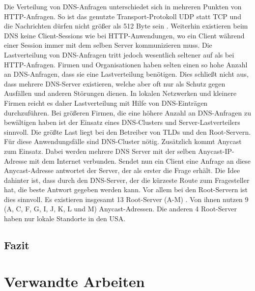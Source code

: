 \documentclass[a4paper, 12pt, BCOR10mm, DIV12, toc=bibliography, toc=listof, german]{scrbook}
\begin{document}
			Die Verteilung von DNS-Anfragen unterschiedet sich in mehreren Punkten von HTTP-Anfragen. So
			ist das genutzte Transport-Protokoll UDP statt TCP und die Nachrichten dürfen nicht größer als
			512 Byte sein \cite{rfc1035}. Weiterhin existieren beim DNS keine Client-Sessions wie bei
			HTTP-Anwendungen, wo ein Client während einer Session immer mit dem selben Server
			kommunizieren muss. Die Lastverteilung von DNS-Anfragen tritt jedoch wesentlich seltener auf
			als bei HTTP-Anfragen. Firmen und Organisationen haben selten einen so hohe Anzahl an
			DNS-Anfragen, dass sie eine Lastverteilung benötigen. Dies schließt nicht aus, dass mehrere
			DNS-Server existieren, welche aber oft nur als Schutz gegen Ausfällen und anderen Störungen
			dienen.  In lokalen Netzwerken und kleinere Firmen reicht es daher Lastverteilung mit Hilfe
			von DNS-Einträgen durchzuführen. Bei größeren Firmen, die eine höhere Anzahl an DNS-Anfragen
			zu bewältigen haben ist der Einsatz eines DNS-Clusters und Server-Lastverteilers sinnvoll. Die
			größte Last liegt bei den Betreiber von TLDs und den Root-Servern. Für diese Anwendungsfälle
			sind DNS-Cluster nötig. Zusätzlich kommt Anycast \cite{rfc4786, sapate2005} zum Einsatz. Dabei
			werden mehrere DNS Server mit der selben Anycast-IP-Adresse mit dem Internet verbunden. Sendet
			nun ein Client eine Anfrage an diese Anycast-Adresse antwortet der Server, der als erster die
			Frage erhält. Die Idee dahinter ist, dass durch den DNS-Server, der die kürzeste Route zum
			Fragesteller hat, die beste Antwort gegeben werden kann. Vor allem bei den Root-Servern ist
			dies sinnvoll. Es existieren insgesamt 13 Root-Server
			(A-M) \cite{rootserver}. Von ihnen nutzen 9 (A, C, F, G, I, J, K, L und M)
			Anycast-Adressen. Die anderen 4 Root-Server haben nur lokale Standorte in den USA. 
				


		\section{Fazit} %
		\label{sec:grundlagen-fazit}
		


	\chapter{Verwandte Arbeiten} %
	\label{cha:arbeiten}
\end{document}
